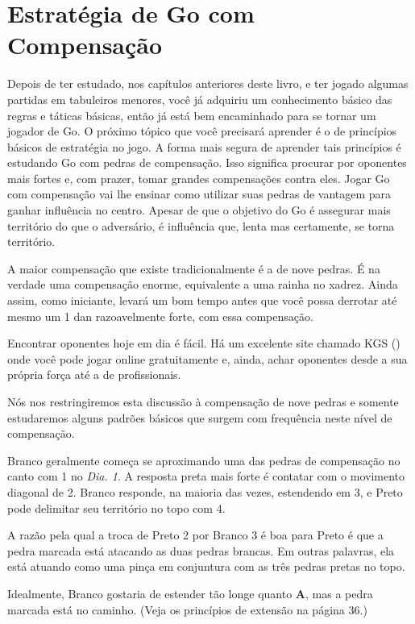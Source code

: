 \chapter{Estratégia de Go com Compensação}\label{chap:estrat_comp}

Depois de ter estudado, nos capítulos anteriores deste livro, e ter jogado algumas partidas em tabuleiros menores, você já adquiriu um conhecimento básico das regras e táticas básicas, então já está bem encaminhado para se tornar um jogador de Go. O próximo tópico que você precisará aprender é o de princípios básicos de estratégia no jogo. A forma mais segura de aprender tais princípios é estudando Go com pedras de compensação. Isso significa procurar por oponentes mais fortes e, com prazer, tomar grandes compensações contra eles. Jogar Go com compensação vai lhe ensinar como utilizar suas pedras de vantagem para ganhar influência no centro. Apesar de que o objetivo do Go é assegurar mais território do que o adversário, é influência que, lenta mas certamente, se torna território.

A maior compensação que existe tradicionalmente é a de nove pedras. É na verdade uma compensação enorme, equivalente a uma rainha no xadrez. Ainda assim, como iniciante, levará um bom tempo antes que você possa derrotar até mesmo um 1 dan razoavelmente forte, com essa compensação.

Encontrar oponentes hoje em dia é fácil. Há um excelente site chamado KGS (\href{https://www.gokgs.com}{})~\cite{kgs} onde você pode jogar online gratuitamente e, ainda, achar oponentes desde a sua própria força até a de profissionais.

Nós nos restringiremos esta discussão à compensação de nove pedras e somente estudaremos alguns padrões básicos que surgem com frequência neste nível de compensação.

\bigskip

Branco geralmente começa se aproximando uma das pedras de compensação no canto com 1 no \emph{Dia. 1}. A resposta preta mais forte é contatar com o movimento diagonal de 2. Branco responde, na maioria das vezes, estendendo em 3, e Preto pode delimitar seu território no topo com 4.

A razão pela qual a troca de Preto 2 por Branco 3 é boa para Preto é que a pedra marcada está atacando as duas pedras brancas. Em outras palavras, ela está atuando como uma pinça em conjuntura com as três pedras pretas no topo.

Idealmente, Branco gostaria de estender tão longe quanto \textbf{A}, mas a pedra marcada está no caminho. (Veja os princípios de extensão na página 36.)

